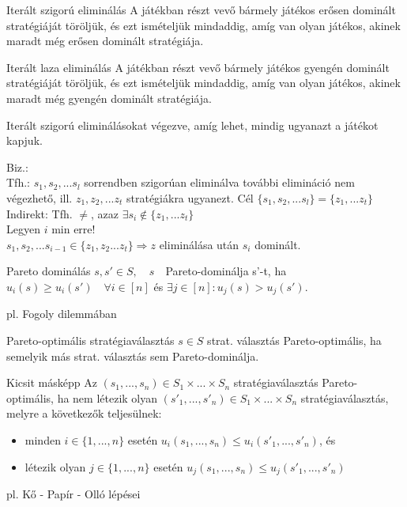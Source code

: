 	\begin{definition}{Iterált szigorú eliminálás}{}
		A játékban részt vevő bármely játékos erősen dominált stratégiáját töröljük, és ezt ismételjük mindaddig, amíg van olyan játékos, akinek maradt még erősen dominált
		stratégiája.
	\end{definition}
	
	\begin{definition}{Iterált laza eliminálás}{}
		A játékban részt vevő bármely játékos gyengén dominált stratégiáját töröljük, és ezt ismételjük mindaddig, amíg van olyan játékos, akinek maradt még gyengén dominált
		stratégiája.
	\end{definition}
	
	\begin{theorem}{}{}
		Iterált szigorú eliminálásokat végezve, amíg lehet, mindig ugyanazt a játékot kapjuk.
	\end{theorem}
	Biz.:\\
	Tfh.: $s_1, s_2, ... s_l$ sorrendben szigorúan eliminálva további elimináció nem végezhető, ill. $z_1, z_2, ... z_t$ stratégiákra ugyanezt. Cél $\{ s_1, s_2, ... s_l\} = \{z_1, ... z_t\}$\\
	Indirekt: Tfh. $\neq$, azaz  $\exists s_i \notin \{z_1, ... z_t\}$\\
	Legyen $i$ min erre!\\
	$s_1, s_2, ... s_{i-1} \in \{z_1, z_2 ... z_t\} \Longrightarrow z$ eliminálása után $s_i$ dominált.
	
	\begin{definition}{Pareto dominálás}{}
		$s, s' \in S, \quad s \quad$Pareto-dominálja s'-t, ha $u_i(s) \geq u_i(s') \quad \forall i \in [n]$ és $\exists j \in [n] : u_j(s) > u_j(s')$.
	\end{definition}
	pl. Fogoly dilemmában
	
	\begin{definition}{Pareto-optimális stratégiaválasztás}{}
		$s \in S$ strat. választás Pareto-optimális, ha semelyik más strat. választás sem Pareto-dominálja.
	\end{definition}
	
	\begin{remark}{Kicsit másképp}{}
		Az $(s_1, ..., s_n) \in S_1 \times ... \times S_n$ stratégiaválasztás Pareto-optimális, ha nem létezik olyan $(s'_1, ..., s'_n) \in S_1 \times ... \times S_n$ stratégiaválasztás, melyre a következők teljesülnek:
		\begin{itemize}
			\item minden $i \in \{1, ..., n\}$ esetén $u_i(s_1, ..., s_n) \leq u_i(s'_1, ..., s'_n)$, és
			\item létezik olyan $j \in \{1, ..., n\}$ esetén $u_j(s_1, ..., s_n) \leq u_j(s'_1, ..., s'_n)$
		\end{itemize}
	\end{remark}
	pl. Kő - Papír - Olló lépései
	
